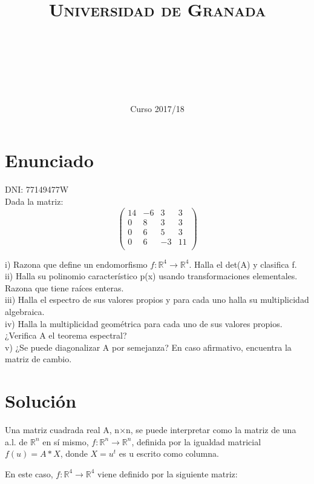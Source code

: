 \documentclass[11pt, a4paper]{article}
\title{
  \normalfont \normalsize 
  \textsc{Universidad de Granada} \\ [25pt]    %
  \horrule{0.5pt} \\[0.4cm] %
  \huge \sffamily\subject\\ %
  \horrule{2pt} \\[0.5cm] %
}
\author{\Large\sffamily{\docauthor}}
\date{\vspace{-1.5em} \normalsize \sffamily Curso 2017/18}
\newif\IfInSansMode
\newcommand{\R}{\mathbb{R}} \newcommand{\N}{\mathbb{N}}
\theoremstyle{theorem-style}
\theoremstyle{definition-style}
\theoremstyle{remark-style}
\theoremstyle{example-style}
\begin{document}
\maketitle  %
\vfill
\begin{center}
\end{center}
\newpage
\tableofcontents    %
\newpage



\section{Enunciado}
DNI: 77149477W \\
Dada la matriz:
 $$\begin{pmatrix}
	14 & -6 & 3 & 3\\
	0 & 8 & 3 & 3\\
	0 & 6 & 5 & 3\\
	0 & 6 & -3 & 11 \\
\end{pmatrix}$$
	
i) Razona que define un endomorfismo $f: \R^4 \to \R^4$. Halla el det(A) y clasifica f.\\
ii) Halla su polinomio característico p(x) usando transformaciones elementales. Razona que tiene raíces enteras.\\
iii) Halla el espectro de sus valores propios y para cada uno halla su multiplicidad algebraica.\\
iv) Halla la multiplicidad geométrica para cada uno de sus valores propios.¿Verifica A el teorema espectral?\\
v) ¿Se puede diagonalizar A por semejanza? En caso afirmativo, encuentra la matriz de cambio.\\

\section{Solución}

Una matriz cuadrada real A, n×n, se puede interpretar como la matriz de una a.l. de $\R^n$ en sí mismo, $f: \R^n \to \R^n$, definida por la igualdad matricial $f(u)=A*X$, donde $X=u^{t}$ es u escrito como columna.

En este caso, $f: \R^4 \to \R^4$ viene definido por la siguiente matriz:
\end{document}
